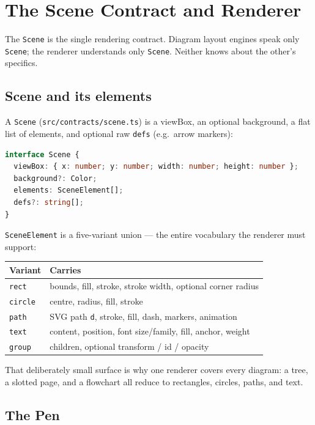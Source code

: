 \section{The Scene Contract and Renderer}
\label{sec:scene}

The \texttt{Scene} is the single rendering contract. Diagram layout engines speak
only \texttt{Scene}; the renderer understands only \texttt{Scene}. Neither knows
about the other's specifics.

\subsection{Scene and its elements}

A \texttt{Scene} (\texttt{src/contracts/scene.ts}) is a viewBox, an optional
background, a flat list of elements, and optional raw \texttt{defs} (e.g.\ arrow
markers):

\begin{lstlisting}[language=ts]
interface Scene {
  viewBox: { x: number; y: number; width: number; height: number };
  background?: Color;
  elements: SceneElement[];
  defs?: string[];
}
\end{lstlisting}

\texttt{SceneElement} is a five-variant union --- the entire vocabulary the
renderer must support:

\begin{center}
\begin{tabular}{ll}
\toprule
Variant & Carries \\
\midrule
\texttt{rect}   & bounds, fill, stroke, stroke width, optional corner radius \\
\texttt{circle} & centre, radius, fill, stroke \\
\texttt{path}   & SVG path \texttt{d}, stroke, fill, dash, markers, animation \\
\texttt{text}   & content, position, font size/family, fill, anchor, weight \\
\texttt{group}  & children, optional transform / id / opacity \\
\bottomrule
\end{tabular}
\end{center}

That deliberately small surface is why one renderer covers every diagram: a tree,
a slotted page, and a flowchart all reduce to rectangles, circles, paths, and
text.

\subsection{The Pen}


